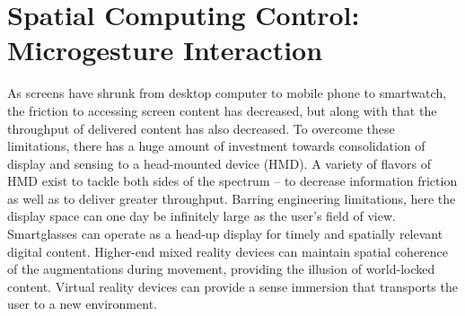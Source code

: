 \documentclass [11pt, proquest] {uwthesis}[2020/02/24]
\begin{document}













 

\section{Spatial Computing Control: Microgesture Interaction}

As screens have shrunk from desktop computer to mobile phone to smartwatch, the friction to accessing screen content has decreased, but along with that the throughput of delivered content has also decreased. To overcome these limitations, there has a huge amount of investment towards consolidation of display and sensing to a head-mounted device (HMD). A variety of flavors of HMD exist to tackle both sides of the spectrum -- to decrease information friction as well as to deliver greater throughput. Barring engineering limitations, here the display space can one day be infinitely large as the user's field of view. Smartglasses can operate as a head-up display for timely and spatially relevant digital content. Higher-end mixed reality devices can maintain spatial coherence of the augmentations during movement, providing the illusion of world-locked content. Virtual reality devices can provide a sense immersion that transports the user to a new environment.
\end{document}
